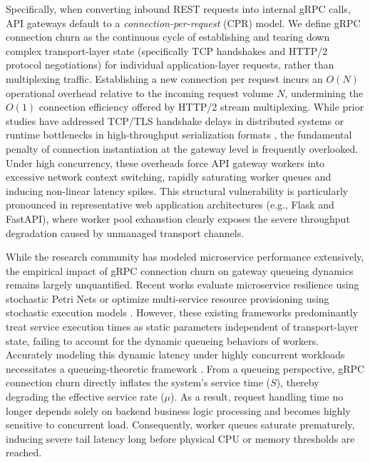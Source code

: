 \documentclass{ieeeaccess}
\begin{document}
Specifically, when converting inbound REST requests into internal gRPC calls, API gateways default to a \textit{connection-per-request} (CPR) model.  We define gRPC connection churn as the continuous cycle of establishing and tearing down complex transport-layer state (specifically TCP handshakes and HTTP/2 protocol negotiations) for individual application-layer requests, rather than multiplexing traffic.  Establishing a new connection per request incurs an $O(N)$ operational overhead relative to the incoming request volume $N$, undermining the $O(1)$ connection efficiency offered by HTTP/2 stream multiplexing.
While prior studies have addressed TCP/TLS handshake delays in distributed systems \cite{guo2020stateful} or runtime bottlenecks in high-throughput serialization formats \cite{sampson2026simplicity}, the fundamental penalty of connection instantiation at the gateway level is frequently overlooked. Under high concurrency, these overheads force API gateway workers into excessive network context switching, rapidly saturating worker queues and inducing non-linear latency spikes. This structural vulnerability is particularly pronounced in representative web application architectures \cite{wsgi-pep} (e.g., Flask and FastAPI), where worker pool exhaustion clearly exposes the severe throughput degradation caused by unmanaged transport channels.
	
While the research community has modeled microservice performance extensively, the empirical impact of gRPC connection churn on gateway queueing dynamics remains largely unquantified. Recent works evaluate microservice resilience using stochastic Petri Nets \cite{pinheiro2024performance} or optimize multi-service resource provisioning using stochastic execution models \cite{carnevali2025compositional}. However, these existing frameworks predominantly treat service execution times as static parameters independent of transport-layer state, failing to account for the dynamic queueing behaviors of workers. Accurately modeling this dynamic latency under highly concurrent workloads necessitates a queueing-theoretic framework \cite{DAuria2021AnMQA}.  From a queueing perspective, gRPC connection churn directly inflates the system's service time ($S$), thereby degrading the effective service rate ($\mu$).  As a result, request handling time no longer depends solely on backend business logic processing and becomes highly sensitive to concurrent load. Consequently, worker queues saturate prematurely, inducing severe tail latency long before physical CPU or memory thresholds are reached.
	
\end{document}
